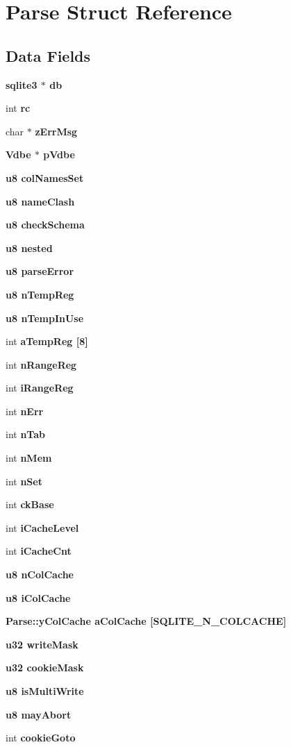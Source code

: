 \section{Parse Struct Reference}
\label{structParse}
\subsection*{Data Fields}
\begin{CompactItemize}
\item 
\bf{sqlite3} $\ast$ \bf{db}
\item 
int \bf{rc}
\item 
char $\ast$ \bf{z\-Err\-Msg}
\item 
\bf{Vdbe} $\ast$ \bf{p\-Vdbe}
\item 
\bf{u8} \bf{col\-Names\-Set}
\item 
\bf{u8} \bf{name\-Clash}
\item 
\bf{u8} \bf{check\-Schema}
\item 
\bf{u8} \bf{nested}
\item 
\bf{u8} \bf{parse\-Error}
\item 
\bf{u8} \bf{n\-Temp\-Reg}
\item 
\bf{u8} \bf{n\-Temp\-In\-Use}
\item 
int \bf{a\-Temp\-Reg} [8]
\item 
int \bf{n\-Range\-Reg}
\item 
int \bf{i\-Range\-Reg}
\item 
int \bf{n\-Err}
\item 
int \bf{n\-Tab}
\item 
int \bf{n\-Mem}
\item 
int \bf{n\-Set}
\item 
int \bf{ck\-Base}
\item 
int \bf{i\-Cache\-Level}
\item 
int \bf{i\-Cache\-Cnt}
\item 
\bf{u8} \bf{n\-Col\-Cache}
\item 
\bf{u8} \bf{i\-Col\-Cache}
\item 
\bf{Parse::y\-Col\-Cache} \bf{a\-Col\-Cache} [SQLITE\_\-N\_\-COLCACHE]
\item 
\bf{u32} \bf{write\-Mask}
\item 
\bf{u32} \bf{cookie\-Mask}
\item 
\bf{u8} \bf{is\-Multi\-Write}
\item 
\bf{u8} \bf{may\-Abort}
\item 
int \bf{cookie\-Goto}
\item 

\end{CompactItemize}
